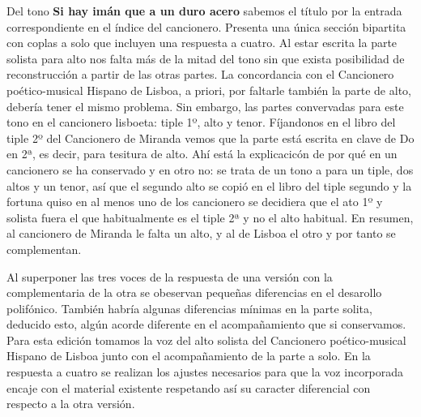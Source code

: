 Del tono \textbf{Si hay imán que a un duro acero} sabemos el título por la entrada correspondiente en el índice del cancionero. Presenta una única sección bipartita con coplas a solo que incluyen una respuesta a cuatro. Al estar escrita la parte solista para alto nos falta más de la mitad del tono sin que exista posibilidad de reconstrucción a partir de las otras partes. La concordancia con el Cancionero poético-musical Hispano de Lisboa, a priori, por faltarle también la parte de alto, debería tener el mismo problema. Sin embargo, las partes convervadas para este tono en el cancionero lisboeta: tiple 1º, alto y tenor. Fíjandonos en el libro del tiple 2º del Cancionero de Miranda vemos que la parte está escrita en clave de Do en 2ª, es decir, para tesitura de alto. Ahí está la explicacicón de por qué en un cancionero se ha conservado y en otro no: se trata de un tono a para un tiple, dos altos y un tenor, así que el segundo alto se copió en el libro del tiple segundo y la fortuna quiso en al menos uno de los cancionero se decidiera que el ato 1º y solista fuera el que habitualmente es el tiple 2ª y no el alto habitual. En resumen, al cancionero de Miranda le falta un alto, y al de Lisboa el otro y por tanto se complementan.

Al superponer las tres voces de la respuesta de una versión con la complementaria de la otra se obeservan pequeñas diferencias en el desarollo polifónico. También habría algunas diferencias mínimas en la parte solita, deducido esto, algún acorde diferente en el acompañamiento que si conservamos. Para esta edición tomamos la voz del alto solista del Cancionero poético-musical Hispano de Lisboa junto con el acompañamiento de la parte a solo. En la respuesta a cuatro se realizan los ajustes necesarios para que la voz incorporada encaje con el material existente respetando así su caracter diferencial con respecto a la otra versión.


